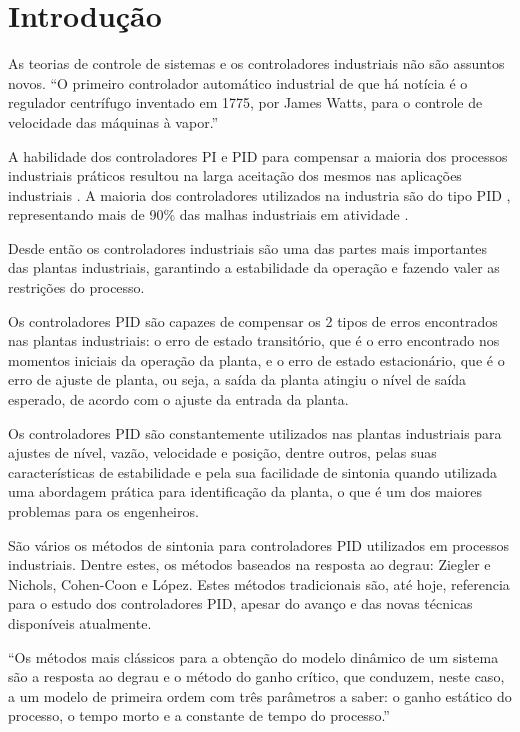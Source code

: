 \chapter{Introdução\label{cap:introducao}}

    As teorias de controle de sistemas e os controladores industriais não são assuntos
    novos. ``O primeiro controlador automático industrial de que há notícia é o regulador centrífugo
    inventado em 1775, por James Watts, para o controle de velocidade das máquinas à vapor.''
    \cite{senai}

    A habilidade dos controladores \ac{PI} e \ac{PID} para compensar a maioria dos processos
    industriais práticos resultou na larga aceitação dos mesmos nas aplicações industriais
    \cite{Dwyer}. A maioria dos controladores utilizados na industria são do tipo
    \acs{PID} \cite{astrom1984645}, representando mais de 90\% das malhas industriais
    em atividade \cite{astrom20011163}. 

    Desde então os controladores industriais são uma das partes mais importantes das
    plantas industriais, garantindo a estabilidade da operação e fazendo valer as restrições
    do processo.

    Os controladores \acs{PID} são capazes de compensar os 2 tipos de erros encontrados
    nas plantas industriais: o erro de estado transitório, que é o erro encontrado nos momentos
    iniciais da operação da planta, e o erro de estado estacionário, que é o erro de
    ajuste de planta, ou seja, a saída da planta atingiu o nível de saída esperado, de
    acordo com o ajuste da entrada da planta.

    Os controladores \acs{PID} são constantemente utilizados nas plantas industriais para
    ajustes de nível, vazão, velocidade e posição, dentre outros, pelas suas características
    de estabilidade e pela sua facilidade de sintonia quando utilizada uma abordagem prática
    para identificação da planta, o que é um dos maiores problemas para os engenheiros.

    São vários os métodos de sintonia para controladores \acs{PID} utilizados em processos
    industriais. Dentre estes, os métodos baseados na resposta ao degrau: Ziegler e Nichols,
    Cohen-Coon e López. Estes métodos tradicionais são, até hoje, referencia para o estudo
    dos controladores \ac{PID}, apesar do avanço e das novas técnicas disponíveis atualmente.

    ``Os métodos mais clássicos para a obtenção do modelo dinâmico de um sistema são a
    resposta ao degrau e o método do ganho crítico, que conduzem, neste caso, a um modelo de
    primeira ordem com três parâmetros a saber: o ganho estático do processo, o tempo morto
    e a constante de tempo do processo.'' \cite{carmo}

